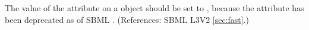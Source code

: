 The value of the attribute  on a \Reaction object should be
set to , because the  attribute has been deprecated as of SBML \thisLV.  (References: SBML L3V2
\ref{sec:fast}.)
